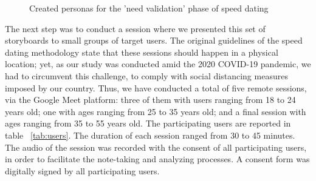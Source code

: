 \begin{figure}[htbp]
	\centering
	 \qquad
		 \qquad
	\caption{Created personas for the 'need validation' phase of speed dating}
	\label{fig:personas}
\end{figure}



The next step was to conduct a session where we presented this set of storyboards to small groups of target users. The original guidelines of the speed dating methodology state that these sessions should happen in a physical location; yet, as our study was conducted amid the 2020 COVID-19 pandemic, we had to circumvent this challenge, to comply with social distancing measures imposed by our country. Thus, we have conducted a total of five remote sessions, via the Google Meet platform: three of them with users ranging from 18 to 24 years old; one with ages ranging from 25 to 35 years old; and a final session with ages ranging from 35 to 55 years old. The participating users are reported in table ~\ref{tab:users}. The duration of each session ranged from 30 to 45 minutes. The audio of the session was recorded with the consent of all participating users, in order to facilitate the note-taking and analyzing processes. A consent form was digitally signed by all participating users.

